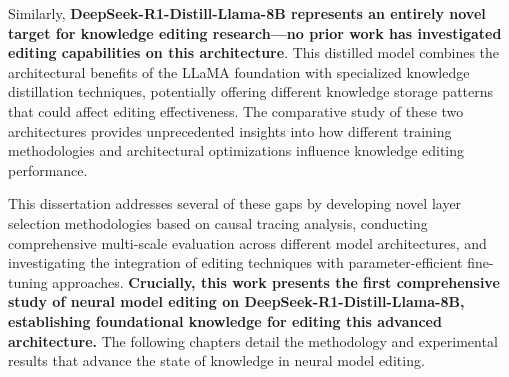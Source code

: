 Similarly, \textbf{DeepSeek-R1-Distill-Llama-8B represents an entirely novel target for knowledge editing research—no prior work has investigated editing capabilities on this architecture}. This distilled model combines the architectural benefits of the LLaMA foundation with specialized knowledge distillation techniques, potentially offering different knowledge storage patterns that could affect editing effectiveness. The comparative study of these two architectures provides unprecedented insights into how different training methodologies and architectural optimizations influence knowledge editing performance.

This dissertation addresses several of these gaps by developing novel layer selection methodologies based on causal tracing analysis, conducting comprehensive multi-scale evaluation across different model architectures, and investigating the integration of editing techniques with parameter-efficient fine-tuning approaches. \textbf{Crucially, this work presents the first comprehensive study of neural model editing on DeepSeek-R1-Distill-Llama-8B, establishing foundational knowledge for editing this advanced architecture.} The following chapters detail the methodology and experimental results that advance the state of knowledge in neural model editing.